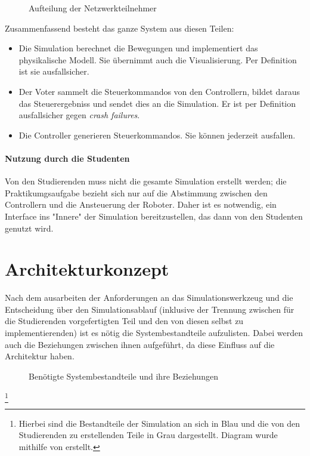 \begin{figure}
	\centering
	\caption{Aufteilung der Netzwerkteilnehmer}
	\label{fig:network}
\end{figure}

Zusammenfassend besteht das ganze System aus diesen Teilen:
\begin{itemize}
	\item Die Simulation berechnet die Bewegungen und implementiert das physikalische Modell. Sie {\"{u}}bernimmt auch die Visualisierung. Per Definition ist sie ausfallsicher.
	\item Der Voter sammelt die Steuerkommandos von den Controllern, bildet daraus das Steuerergebniss und sendet dies an die Simulation. Er ist per Definition ausfallsicher gegen \textit{crash failures}.
	\item Die Controller generieren Steuerkommandos. Sie k{\"{o}}nnen jederzeit ausfallen.
\end{itemize}

\paragraph{Nutzung durch die Studenten} Von den Studierenden muss nicht die gesamte Simulation erstellt werden;
die Praktikumgsaufgabe bezieht sich nur auf die Abstimmung zwischen den Controllern und die Ansteuerung der Roboter.
Daher ist es notwendig, ein Interface ins "Innere" der Simulation bereitzustellen, das dann von den Studenten genutzt wird.

\clearpage
\section{Architekturkonzept}
Nach dem ausarbeiten der Anforderungen an das Simulationswerkzeug und die Entscheidung {\"{u}}ber den Simulationsablauf (inklusive
der Trennung zwischen f{\"{u}}r die Studierenden vorgefertigten Teil und den von diesen selbst zu implementierenden) ist es n{\"{o}}tig
die Systembestandteile aufzulisten. Dabei werden auch die Beziehungen zwischen ihnen aufgef{\"{u}}hrt, da diese Einfluss auf die
Architektur haben.

\begin{figure}
	\centering
	\caption{Ben{\"{o}}tigte Systembestandteile und ihre Beziehungen}
	\label{fig:arch_pre}
\end{figure}
\footnote{Hierbei sind die Bestandteile der Simulation an sich in Blau und die von den Studierenden zu erstellenden Teile in Grau
dargestellt. Diagram wurde mithilfe von \cite{Hunter:2007} erstellt.}

